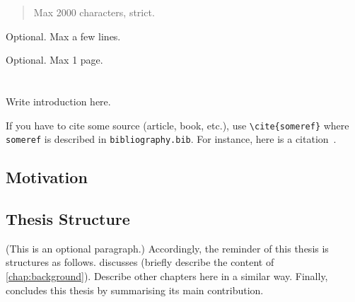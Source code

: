 \documentclass[12pt,a4paper,openright,twoside]{book}
\begin{document}
\pagestyle{empty}
	
\frontmatter




\begin{abstract}	
Max 2000 characters, strict.
\end{abstract}

\begin{dedication} %
Optional. Max a few lines.
\end{dedication}

\begin{acknowledgements} %
Optional. Max 1 page.
\end{acknowledgements}

\tableofcontents   
\listoffigures     %
\lstlistoflistings %


\mainmatter

\chapter{\introductionname}
\label{chap:introduction}

Write introduction here.

If you have to cite some source (article, book, etc.),
 use \lstinline|\cite{someref}| where \texttt{someref} is described in \texttt{bibliography.bib}.
%
For instance, here is a citation~\cite{DBLP:journals/eaai/CasadeiVAPD21}.


\section{Motivation}

%
\section{Thesis Structure} %
%

(This is an optional paragraph.)
%
Accordingly, the reminder of this thesis is structures as follows.
%
 discusses (briefly describe the content of \cref{chap:background}).
%
Describe other chapters here in a similar way.
%
Finally,  concludes this thesis by summarising its main contribution.
\end{document}
